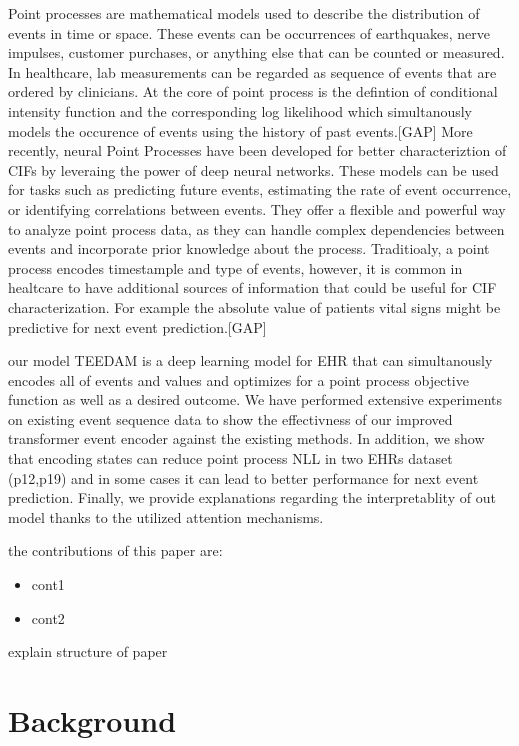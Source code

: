 \documentclass[journal,twoside,web]{ieeecolor}
\begin{document}
Point processes are mathematical models used to describe the distribution of events in time or space. These events can be occurrences of earthquakes, nerve impulses, customer purchases, or anything else that can be counted or measured.
In healthcare, lab measurements can be regarded as sequence of events that are ordered by clinicians. At the core of point process is the defintion of conditional intensity function and the corresponding log likelihood which simultanously models the occurence of events using the history of past events.[GAP]
More recently, neural Point Processes have been developed for better characteriztion of CIFs by leveraing the power of deep neural networks. These models can be used for tasks such as predicting future events, estimating the rate of event occurrence, or identifying correlations between events. They offer a flexible and powerful way to analyze point process data, as they can handle complex dependencies between events and incorporate prior knowledge about the process. Traditioaly, a point process encodes timestample and type of events, however, it is common in healtcare to have additional sources of information that could be useful for CIF characterization. For example the absolute value of patients vital signs might be predictive for next event prediction.[GAP]

our model TEEDAM is a deep learning model for EHR that can simultanously 
encodes all of events and values and optimizes for a point process objective function as well as a desired outcome. We have performed extensive experiments on existing event sequence data to show the effectivness of our improved transformer event encoder against the existing methods. In addition, we show that encoding states can reduce point process NLL in two EHRs dataset (p12,p19) and in some cases it can lead to better performance for next event prediction. Finally, we provide explanations regarding the interpretablity of out model thanks to the utilized attention mechanisms.

the contributions of this paper are:
\begin{itemize}
    \item cont1
    \item cont2
\end{itemize}


explain structure of paper



\section{Background}
\label{sec:Background}
\end{document}
